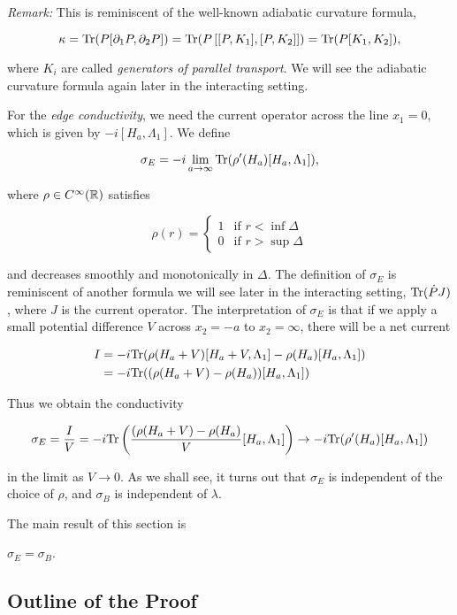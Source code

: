 \documentclass[12pt, letterpaper]{article}
\begin{document}
\textit{Remark:} This is reminiscent of the well-known adiabatic curvature formula,

\[\kappa = \text{Tr}(P[\partial_1P,\partial_2 P]) = \text{Tr}(P\left[ [P,K_1], [P,K_2] \right]) = \text{Tr}(P[K_1,K_2]),\]

where $K_i$ are called \textit{generators of parallel transport}. We will see the adiabatic curvature formula again later in the interacting setting. 

For the \textit{edge conductivity}, we need the current operator across the line $x_1=0$, which is given by $-i[H_a,\Lambda_1]$. We define 

\[\sigma_E = -i\lim_{a\to\infty}\text{Tr}(\rho'(H_a)[H_a,\Lambda_1]),\]

where $\rho \in C^\infty(\mathbb{R})$ satisfies

\[\rho(r) = \begin{cases} 1 & \text{if } r<\inf\Delta\\ 0 & \text{if } r>\sup\Delta\end{cases}\]

and decreases smoothly and monotonically in $\Delta$. The definition of $\sigma_E$ is reminiscent of another formula we will see later in the interacting setting, $\text{Tr}(\dot{P}J)$, where $J$ is the current operator. The interpretation of $\sigma_E$ is that if we apply a small potential difference $V$ across $x_2=-a$ to $x_2=\infty$, there will be a net current

\[\begin{aligned}
I &= -i\text{Tr}(\rho(H_a+V)[H_a+V,\Lambda_1] - \rho(H_a)[H_a,\Lambda_1])\\
&= -i\text{Tr}((\rho(H_a+V)-\rho(H_a))[H_a,\Lambda_1])
\end{aligned}\]

Thus we obtain the conductivity

\[\sigma_E = \frac{I}{V} = -i\text{Tr}\left(\frac{(\rho(H_a+V)-\rho(H_a)}{V}[H_a,\Lambda_1]\right) \to -i\text{Tr}(\rho'(H_a)[H_a,\Lambda_1])\]

in the limit as $V\to0$. As we shall see, it turns out that $\sigma_E$ is independent of the choice of $\rho$, and $\sigma_B$ is independent of $\lambda$. 

The main result of this section is

\begin{theorem}
$\sigma_E=\sigma_B$.
\end{theorem}

\subsection{Outline of the Proof}
\end{document}
